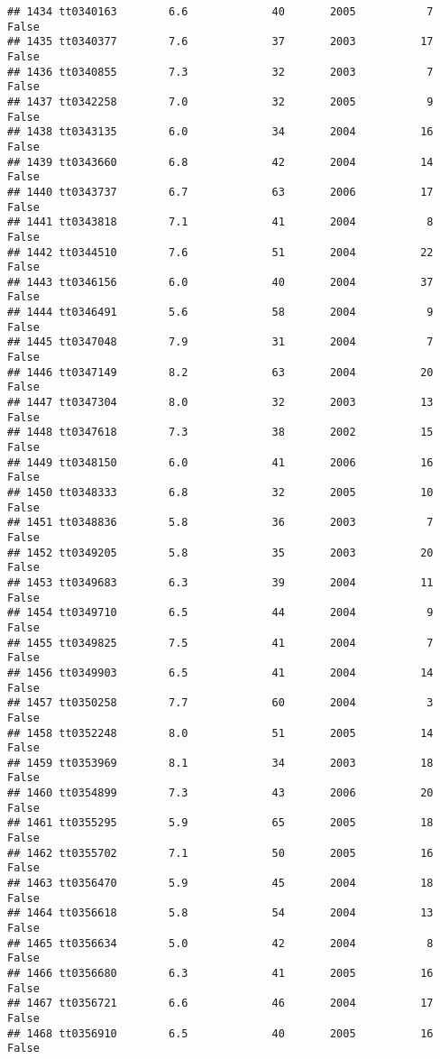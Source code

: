 \documentclass[
]{article}
\begin{document}
\begin{verbatim}
## 1434 tt0340163        6.6             40       2005           7   False
## 1435 tt0340377        7.6             37       2003          17   False
## 1436 tt0340855        7.3             32       2003           7   False
## 1437 tt0342258        7.0             32       2005           9   False
## 1438 tt0343135        6.0             34       2004          16   False
## 1439 tt0343660        6.8             42       2004          14   False
## 1440 tt0343737        6.7             63       2006          17   False
## 1441 tt0343818        7.1             41       2004           8   False
## 1442 tt0344510        7.6             51       2004          22   False
## 1443 tt0346156        6.0             40       2004          37   False
## 1444 tt0346491        5.6             58       2004           9   False
## 1445 tt0347048        7.9             31       2004           7   False
## 1446 tt0347149        8.2             63       2004          20   False
## 1447 tt0347304        8.0             32       2003          13   False
## 1448 tt0347618        7.3             38       2002          15   False
## 1449 tt0348150        6.0             41       2006          16   False
## 1450 tt0348333        6.8             32       2005          10   False
## 1451 tt0348836        5.8             36       2003           7   False
## 1452 tt0349205        5.8             35       2003          20   False
## 1453 tt0349683        6.3             39       2004          11   False
## 1454 tt0349710        6.5             44       2004           9   False
## 1455 tt0349825        7.5             41       2004           7   False
## 1456 tt0349903        6.5             41       2004          14   False
## 1457 tt0350258        7.7             60       2004           3   False
## 1458 tt0352248        8.0             51       2005          14   False
## 1459 tt0353969        8.1             34       2003          18   False
## 1460 tt0354899        7.3             43       2006          20   False
## 1461 tt0355295        5.9             65       2005          18   False
## 1462 tt0355702        7.1             50       2005          16   False
## 1463 tt0356470        5.9             45       2004          18   False
## 1464 tt0356618        5.8             54       2004          13   False
## 1465 tt0356634        5.0             42       2004           8   False
## 1466 tt0356680        6.3             41       2005          16   False
## 1467 tt0356721        6.6             46       2004          17   False
## 1468 tt0356910        6.5             40       2005          16   False

\end{verbatim}
\end{document}
